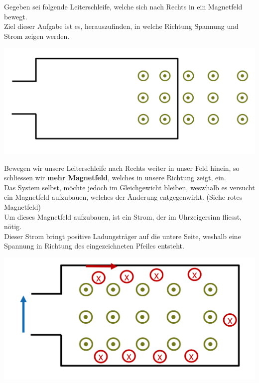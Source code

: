 \beginbsp
Gegeben sei folgende Leiterschleife, welche sich nach Rechts in ein Magnetfeld bewegt. \\
Ziel dieser Aufgabe ist es, herauszufinden, in welche Richtung Spannung und Strom zeigen werden.
\begin{center}
	\includegraphics[scale=0.2]{img/ex-lenzsche-regel}
\end{center}

Bewegen wir unsere Leiterschleife nach Rechts weiter in unser Feld hinein, so schliessen wir \textbf{mehr Magnetfeld}, welches in unsere Richtung zeigt, ein. \\
Das System selbst, möchte jedoch im Gleichgewicht bleiben, weswhalb es versucht ein Magnetfeld aufzubauen, welches der Änderung entgegenwirkt. (Siehe rotes Magnetfeld) \\
Um dieses Magnetfeld aufzubauen, ist ein Strom, der im Uhrzeigersinn fliesst, nötig. \\
Dieser Strom bringt positive Ladungsträger auf die untere Seite, weshalb eine Spannung in Richtung des eingezeichneten Pfeiles entsteht.


\begin{center}

	\includegraphics[scale=0.2]{img/ex-lenzsche-r-sol}
\end{center}
\iend

